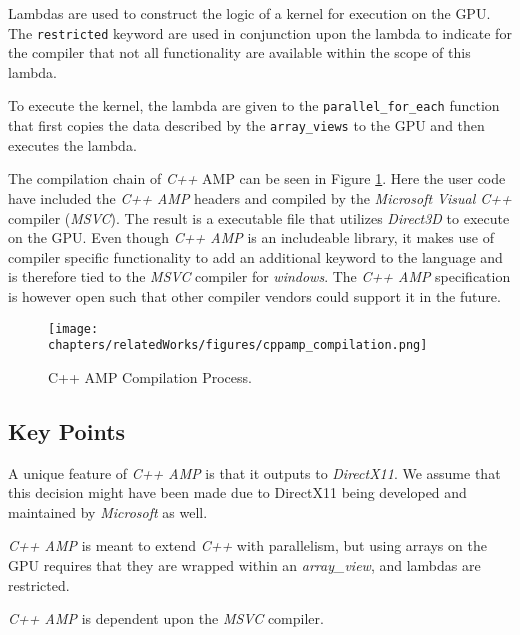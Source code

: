 Lambdas are used to construct the logic of a kernel for execution on the GPU. The \texttt{restricted} keyword are used in conjunction upon the lambda to indicate for the compiler that not all functionality are available within the scope of this lambda. 

To execute the kernel, the lambda are given to the \texttt{parallel\_for\_each} function that first copies the data described by the \texttt{array\_views} to the GPU and then executes the lambda.

The compilation chain of \textit{C++} AMP can be seen in Figure \ref{fig:cppampCompilation}. Here the user code have included the \textit{C++ AMP} headers and compiled by the \textit{Microsoft Visual C++} compiler (\textit{MSVC}). The result is a executable file that utilizes \textit{Direct3D} to execute on the GPU. Even though \textit{C++ AMP} is an includeable library, it makes use of compiler specific functionality to add an additional keyword to the language and is therefore tied to the \textit{MSVC} compiler for \textit{windows}. The \textit{C++ AMP} specification is however open such that other compiler vendors could support it in the future.

\begin{figure}[H]
\center
\texttt{[image: chapters/relatedWorks/figures/cppamp\_compilation.png]}
\caption{C++ AMP Compilation Process.}
\label{fig:cppampCompilation}
\end{figure}

\subsection{Key Points}
A unique feature of \textit{C++ AMP} is that it outputs to \textit{DirectX11}. We assume that this decision might have been made due to DirectX11 being developed and maintained by \textit{Microsoft} as well.

\textit{C++ AMP} is meant to extend \textit{C++} with parallelism, but using arrays on the GPU requires that they are wrapped within an \textit{array\_view}, and lambdas are restricted. 

\textit{C++ AMP} is dependent upon the \textit{MSVC} compiler.

